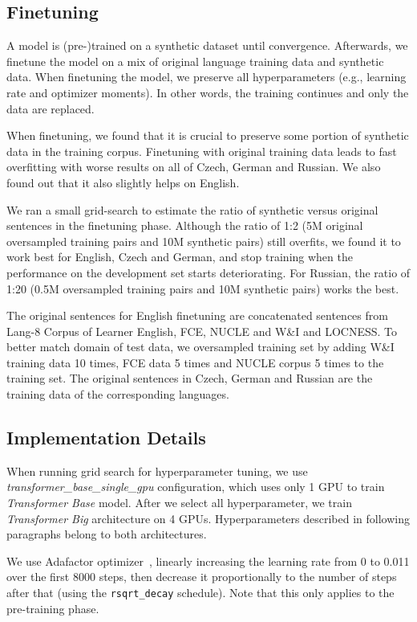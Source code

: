\documentclass[11pt,a4paper]{article}
\begin{document}
\subsection{Finetuning}

A model is (pre-)trained on a synthetic dataset until convergence. Afterwards, we finetune the model on a mix of original language training data and synthetic data. When finetuning the model, we preserve all hyperparameters (e.g., learning rate and optimizer moments). In other words, the training continues and only the data are replaced.

When finetuning, we found that it is crucial to preserve some portion of synthetic data in the training corpus. Finetuning with original training data leads to fast overfitting with worse results on all of Czech, German and Russian. We also found out that it also slightly helps on English.

We ran a small grid-search to estimate the ratio of synthetic versus original sentences in the finetuning phase. Although the ratio of 1:2 (5M original oversampled training pairs and 10M synthetic pairs) still overfits, we found it to work best for English, Czech and German, and stop training when the performance on the development set starts deteriorating. For Russian, the ratio of 1:20 (0.5M oversampled training pairs and 10M synthetic pairs) works the best.

The original sentences for English finetuning are concatenated sentences from Lang-8 Corpus of Learner English, FCE, NUCLE and W\&I and LOCNESS. To better match domain of test data, we oversampled training set by adding W\&I training data 10 times, FCE data 5 times and NUCLE corpus 5 times to the training set. The original sentences in Czech, German and Russian are the training data of the corresponding languages.

\subsection{Implementation Details}

When running grid search for hyperparameter tuning, we use \textit{transformer\_base\_single\_gpu} configuration, which uses only 1 GPU to train \textit{Transformer Base} model. After we select all hyperparameter, we train \textit{Transformer Big} architecture on 4 GPUs. Hyperparameters described in following paragraphs belong to both architectures.

We use Adafactor optimizer~\cite{shazeer2018adafactor}, linearly increasing the learning rate from 0 to 0.011 over the first 8000 steps, then decrease it proportionally to the number of steps after that (using the \texttt{rsqrt\_decay} schedule). Note that this only applies to the pre-training phase.
\end{document}
